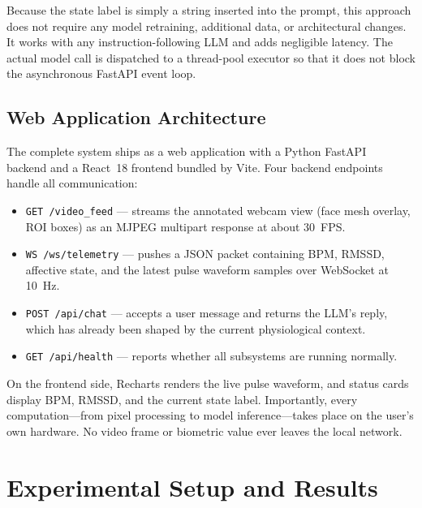 \documentclass[conference]{IEEEtran}
\begin{document}
Because the state label is simply a string inserted into the
prompt, this approach does not require any model retraining,
additional data, or architectural changes. It works with any
instruction-following LLM and adds negligible latency. The
actual model call is dispatched to a thread-pool executor so
that it does not block the asynchronous FastAPI event loop.

\subsection{Web Application Architecture}

The complete system ships as a web application with a Python
FastAPI~\cite{ramirez2018fastapi} backend and a React~18 frontend
bundled by Vite. Four backend endpoints handle all communication:

\begin{itemize}
  \item \texttt{GET /video\_feed} --- streams the annotated webcam
        view (face mesh overlay, ROI boxes) as an MJPEG multipart
        response at about 30~FPS.
  \item \texttt{WS /ws/telemetry} --- pushes a JSON packet
        containing BPM, RMSSD, affective state, and the latest
        pulse waveform samples over WebSocket at 10~Hz.
  \item \texttt{POST /api/chat} --- accepts a user message and
        returns the LLM's reply, which has already been shaped
        by the current physiological context.
  \item \texttt{GET /api/health} --- reports whether all subsystems
        are running normally.
\end{itemize}

On the frontend side, Recharts renders the live pulse waveform,
and status cards display BPM, RMSSD, and the current state label.
Importantly, every computation---from pixel processing to model
inference---takes place on the user's own hardware. No video
frame or biometric value ever leaves the local network.


\section{Experimental Setup and Results}
\label{sec:results}
\end{document}

